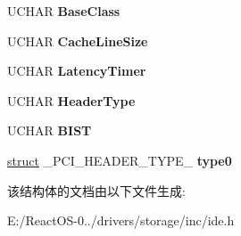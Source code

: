 \begin{DoxyCompactItemize}
\item 
\mbox{\label{struct___p_c_i_i_d_e___c_o_n_f_i_g___h_e_a_d_e_r_ada5f1c8d279dd96ea4a38fa0bc663b4e}} 
U\+C\+H\+AR {\bfseries Base\+Class}
\item 
\mbox{\label{struct___p_c_i_i_d_e___c_o_n_f_i_g___h_e_a_d_e_r_a1495bdf537375aecca1f9b4037cba11b}} 
U\+C\+H\+AR {\bfseries Cache\+Line\+Size}
\item 
\mbox{\label{struct___p_c_i_i_d_e___c_o_n_f_i_g___h_e_a_d_e_r_a8523d69f41c5c577c064bbf21c4625c2}} 
U\+C\+H\+AR {\bfseries Latency\+Timer}
\item 
\mbox{\label{struct___p_c_i_i_d_e___c_o_n_f_i_g___h_e_a_d_e_r_aa5f72b799dad88cd2f467805d7b6696b}} 
U\+C\+H\+AR {\bfseries Header\+Type}
\item 
\mbox{\label{struct___p_c_i_i_d_e___c_o_n_f_i_g___h_e_a_d_e_r_a33aaab39992fa9c7da7a9a6447f032fa}} 
U\+C\+H\+AR {\bfseries B\+I\+ST}
\item 
\mbox{\label{struct___p_c_i_i_d_e___c_o_n_f_i_g___h_e_a_d_e_r_a1da9693b4946efd9cc788d5330d5bfc8}} 
\hyperlink{interfacestruct}{struct} \+\_\+\+P\+C\+I\+\_\+\+H\+E\+A\+D\+E\+R\+\_\+\+T\+Y\+P\+E\+\_ {\bfseries type0}
\end{DoxyCompactItemize}


该结构体的文档由以下文件生成\+:\begin{DoxyCompactItemize}
\item 
E\+:/\+React\+O\+S-\/0../drivers/storage/inc/ide.\+h\end{DoxyCompactItemize}
